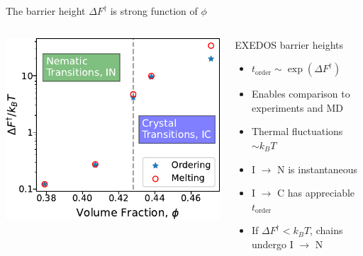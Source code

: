 \documentclass[aspectratio=169]{beamer}
\begin{document}
\begin{frame}[c]{The barrier height $\Delta F^{\dagger}$ is strong function of $\phi$}

  \centering
  \vspace{0.5\baselineskip}

  \begin{columns}[T]

  \includegraphics[]{../figures/ch4_jcp/fig-heights_vs_phi/fig-heights_vs_phi.pdf}

    \begin{block}{EXEDOS barrier heights}
    \begin{itemize}
      \setlength\itemsep{.5em}
      \item $t_{\mathrm{order}} \sim \exp \left( \Delta F^{\dagger} \right)$
      \item Enables comparison to experiments and MD
      \item Thermal fluctuations $\sim k_{B}T$
      \item I $\rightarrow$ N is instantaneous
      \item I $\rightarrow$ C has appreciable $t_{\mathrm{order}}$
      \item If $\Delta F^{\dagger} < k_{B}T$, chains undergo I $\rightarrow$ N
    \end{itemize}
    \end{block}

  \end{columns}

  \par\leavevmode


\end{frame}
\end{document}
